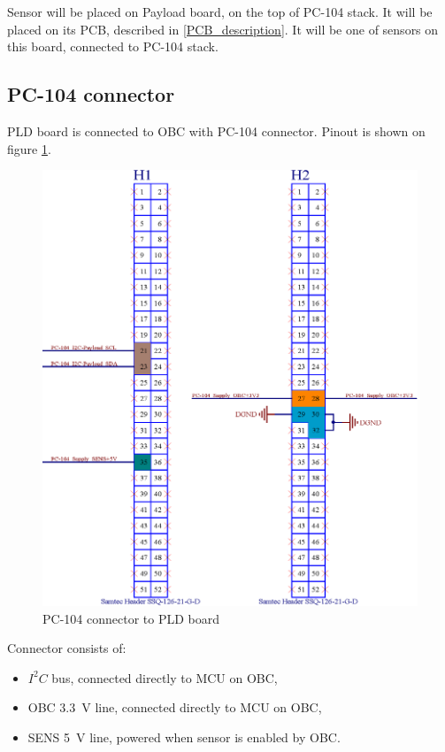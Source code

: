 	Sensor will be placed on Payload board, on the top of PC-104 stack. It will be placed on its PCB, described in \ref{PCB_description}. It will be one of sensors on this board, connected to PC-104 stack.
	
	
\subsection{PC-104 connector}
	PLD board is connected to OBC with PC-104 connector. Pinout is shown on figure \ref{PC104_PLD}.
	
	\begin{figure}[H]
		\centering
		\includegraphics[width=0.5\paperwidth]{img/PC-104.eps}
		\caption{PC-104 connector to PLD board}
		\label{PC104_PLD}
	\end{figure}

	Connector consists of:
	\begin{itemize}
		\item $I^2C$ bus, connected directly to MCU on OBC,
		\item OBC \SI{3.3}{V} line, connected directly to MCU on OBC,
		\item SENS \SI{5}{V} line, powered when sensor is enabled by OBC.
	\end{itemize}

